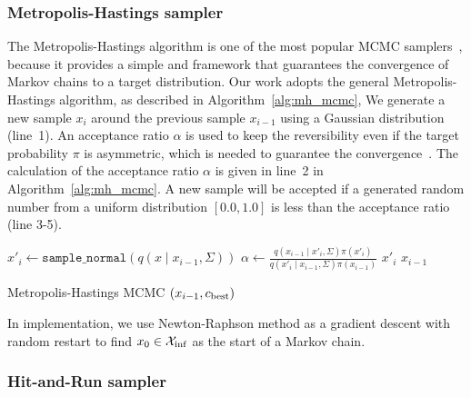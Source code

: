 \documentclass[letterpaper, 10 pt, conference]{ieeeconf}  %
\begin{document}
\subsubsection{Metropolis-Hastings sampler}


The Metropolis-Hastings algorithm is one of the most popular MCMC samplers~\cite{CG95}, because it provides a simple and framework that guarantees the convergence of Markov chains to a target distribution.
Our work adopts the general Metropolis-Hastings algorithm, as described in Algorithm~\ref{alg:mh_mcmc}, 
We generate a new sample $ x_{i}$ around the previous sample $ x_{i-1}$ using a Gaussian distribution (line~1).
An acceptance ratio $ \alpha $ is used to keep the reversibility even if the target probability $ \pi $ is asymmetric, which is needed to guarantee the convergence~\cite{CG95}. 
The calculation of the acceptance ratio $ \alpha $ is given in line~2 in Algorithm~\ref{alg:mh_mcmc}.
A new sample will be accepted if a generated random number from a uniform distribution $[0.0, 1.0 ] $ is less than the acceptance ratio (line 3-5). 


\begin{algorithm}[t]
	\begin{algorithmic}[1]
		\STATE $ x'_{i} \leftarrow \texttt{sample\_normal}( q ( x \mid x_{i-1},\Sigma) ) $ 
		\label{start}
		\STATE $ \alpha \leftarrow \frac{ q ( x_{i-1} \mid x'_{i},\Sigma) \pi( x'_{i} ) }{ q ( x'_{i} \mid x_{i-1},\Sigma) \pi( x_{i-1} ) } $
            \RETURN $ x'_{i} $
		\ENDIF
		\RETURN $ x_{i-1} $
	\end{algorithmic}
	\caption{\captionstyle Metropolis-Hastings MCMC $(x_{i-1}, c_{\rm best})$}
	\label{alg:mh_mcmc}	
\end{algorithm}

In implementation, we use Newton-Raphson method as a gradient descent with random restart to find $ x_0 \in \mathcal{X}_{\rm {inf}} $ as the start of a Markov chain.


\subsubsection{Hit-and-Run sampler}
\end{document}
